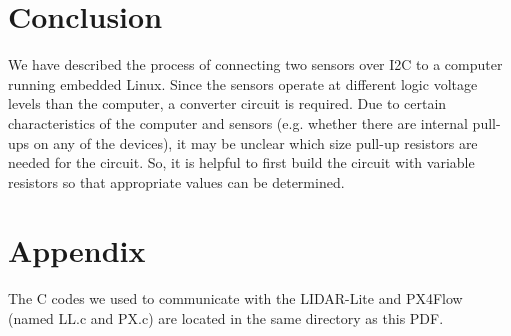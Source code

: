 \documentclass[10pt]{article}
\begin{document}
\section*{Conclusion}

We have described the process of connecting two sensors over I2C to a computer running embedded Linux. Since the sensors operate at different logic voltage levels than the computer, a converter circuit is required. Due to certain characteristics of the computer and sensors (e.g. whether there are internal pull-ups on any of the devices), it may be unclear which size pull-up resistors are needed for the circuit. So, it is helpful to first build the circuit with variable resistors so that appropriate values can be determined.


\section*{Appendix}

The C codes we used to communicate with the LIDAR-Lite and PX4Flow (named LL.c and PX.c) are located in the same directory as this PDF.

\end{document}
